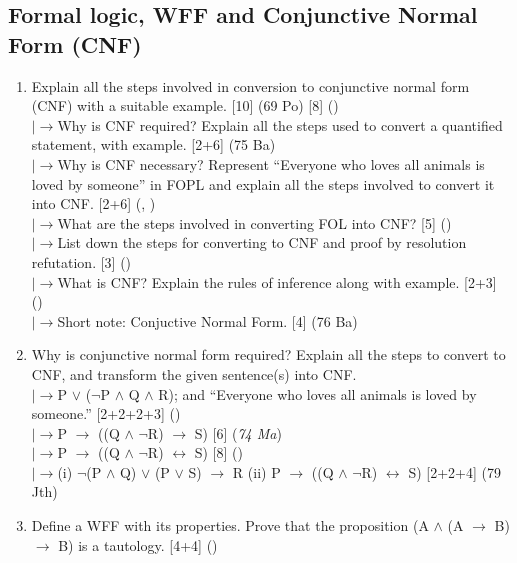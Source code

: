 \documentclass[12pt]{article}
\newcommand{\lb}{\\$\left|\rightarrow\right.$}
\begin{document}
  \subsection{Formal logic, WFF and Conjunctive Normal Form (CNF)}
    \begin{enumerate}[topsep=0pt, noitemsep]
      \item Explain all the steps involved in conversion to conjunctive normal form (CNF) with a suitable example. \hfill [10] (69 Po) [8] ()
        \lb Why is CNF required? Explain all the steps used to convert a quantified statement, with example. \hfill [2+6] (75 Ba)
        \lb Why is CNF necessary? Represent ``Everyone who loves all animals is loved by someone'' in FOPL and explain all the steps involved to convert it into CNF. \hfill [2+6] (, )
        \lb What are the steps involved in converting FOL into CNF? \hfill [5] ()
        \lb List down the steps for converting to CNF and proof by resolution refutation. \hfill [3] ()
        \lb What is CNF? Explain the rules of inference along with example. \hfill [2+3] ()
        \lb Short note: Conjuctive Normal Form. \hfill [4] (76 Ba)

      \item Why is conjunctive normal form required? Explain all the steps to convert to CNF, and transform the given sentence(s) into CNF.
        \lb P $\vee$ ($\neg$P $\wedge$ Q $\wedge$ R); and ``Everyone who loves all animals is loved by someone.'' \hfill [2+2+2+3] ()
        \lb P $\rightarrow$ ((Q $\wedge$ $\neg$R) $\rightarrow$ S) \hfill [6] (\textit{74 Ma})
        \lb P $\rightarrow$ ((Q $\wedge$ $\neg$R) $\leftrightarrow$ S) \hfill [8] ()
        \lb (i) $\neg$(P $\wedge$ Q) $\vee$ (P $\vee$ S) $\rightarrow$ R \quad (ii) P $\rightarrow$ ((Q $\wedge$ $\neg$R) $\leftrightarrow$ S) \hfill [2+2+4] (79 Jth)

      \item Define a WFF with its properties. Prove that the proposition (A $\wedge$ (A $\rightarrow$ B) $\rightarrow$ B) is a tautology. \hfill [4+4] ()
    \end{enumerate}
\end{document}
